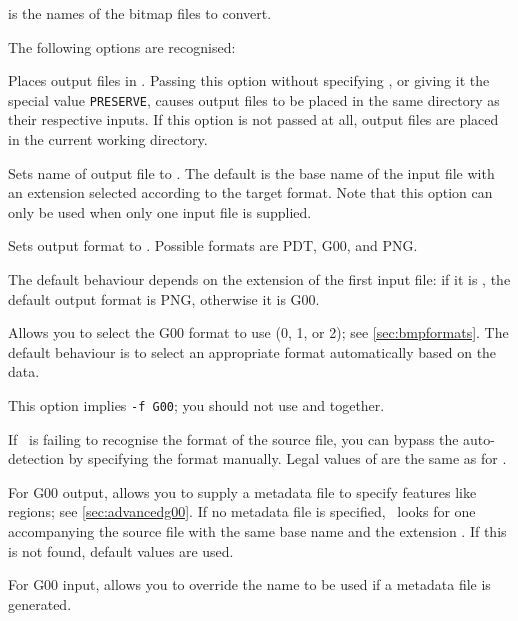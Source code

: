   \noindent{} is the names of the bitmap files to convert.

  The following options are recognised:

  \begin{nicelist}
  \item[\clbarg{d}{outdir}{[DIR]}]
    Places output files in .  Passing this option without
    specifying , or giving it the special value \lstinline|PRESERVE|,
    causes output files to be placed in the same directory as their respective
    inputs.  If this option is not passed at all, output files are placed in the
    current working directory.
  \item[\clbarg{o}{output}{FILE}]
    Sets name of output file to .  The default is the base name
    of the input file with an extension selected according to the target
    format.  Note that this option can only be used when only one input file
    is supplied.
  \item[\clbarg{f}{format}{FMT}]
    Sets output format to .  Possible formats are PDT, G00, and
    PNG.

    The default behaviour depends on the extension of the first input file: if it
    is , the default output format is PNG, otherwise it is G00.
  \item[\clbarg{g}{g00}{FMT}]
    Allows you to select the G00 format to use (0, 1, or 2); see
    \ref{sec:bmpformats}.  The default behaviour is to select an appropriate
    format automatically based on the data.

    This option implies \lstinline|-f G00|; you should not use  and
     together.
  \item[\clbarg{i}{input-format}{FMT}]
    If \converter\ is failing to recognise the format of the source file, you
    can bypass the auto-detection by specifying the format manually.  Legal
    values of  are the same as for .
  \item[\clbarg{m}{metadata}{FILE}]
    For G00 output, allows you to supply a metadata file to specify features
    like regions; see \ref{sec:advancedg00}.  If no metadata file is specified,
    \converter\ looks for one accompanying the source file with the same base
    name and the extension .  If this is not found, default
    values are used.

    For G00 input, allows you to override the name to be used if a metadata
    file is generated.


\end{nicelist}
